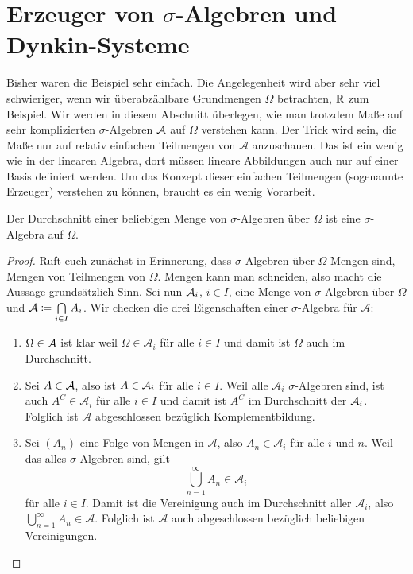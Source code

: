 \section{Erzeuger von $\sigma$-Algebren und Dynkin-Systeme}
Bisher waren die Beispiel sehr einfach. Die Angelegenheit wird aber sehr viel schwieriger, wenn wir \"uberabz\"ahlbare Grundmengen $\Omega$ betrachten, $\mathbb{R}$ zum Beispiel. Wir werden in diesem Abschnitt \"uberlegen, wie man trotzdem Ma\ss e auf sehr komplizierten $\sigma$-Algebren $\mathcal{A}$ auf $\Omega$ verstehen kann. Der Trick wird sein, die Ma\ss e nur auf relativ einfachen Teilmengen von $\mathcal A$ anzuschauen. Das ist ein wenig wie in der linearen Algebra, dort m\"ussen lineare Abbildungen auch nur auf einer Basis definiert werden. Um das Konzept dieser einfachen Teilmengen (sogenannte Erzeuger) verstehen zu k\"onnen, braucht es ein wenig Vorarbeit.
\begin{satz} 
	Der Durchschnitt einer beliebigen Menge von $\sigma$-Algebren \"uber $\Omega$ ist eine $\sigma$-Algebra auf $\Omega$.
\end{satz}
\begin{proof}
	Ruft euch zun\"achst in Erinnerung, dass $\sigma$-Algebren \"uber $\Omega$ Mengen sind, Mengen von Teilmengen von $\Omega$. Mengen kann man schneiden, also macht die Aussage grunds\"atzlich Sinn. Sei nun $\mathcal{A}_i$, $i \in I$, eine Menge von $\sigma$-Algebren \"uber $\Omega$ und $\mathcal{A} \coloneqq \bigcap\limits_{i \in I} A_i$. Wir checken die drei Eigenschaften einer $\sigma$-Algebra f\"ur $\mathcal A$:
	\begin{enumerate}[label=(\roman*)]
		\item $\Omega \in \mathcal{A}$ ist klar weil $\Omega\in \mathcal A_i$ f\"ur alle $i\in I$ und damit ist $\Omega$ auch im Durchschnitt.
		\item Sei $A \in \mathcal{A}$, also ist  $A \in \mathcal{A}_i$ f\"ur alle $i\in I$. Weil alle $\mathcal A_i$ $\sigma$-Algebren sind, ist auch $A^C\in \mathcal A_i$ f\"ur alle $i\in I$ und damit ist $A^C$ im Durchschnitt der $\mathcal{A}_i$. Folglich ist $\mathcal A$ abgeschlossen bez\"uglich Komplementbildung.
				\item Sei $(A_n)$ eine Folge von Mengen in $\mathcal A$, also $A_n \in \mathcal A_i$ f\"ur alle $i$ und $n$. Weil das alles $\sigma$-Algebren sind, gilt \[\bigcup\limits_{n = 1}^{\infty} A_n \in \mathcal A_i \]
				f\"ur alle $i\in I$. Damit ist die Vereinigung auch im Durchschnitt aller $\mathcal A_i$, also 
				$\bigcup\limits_{n = 1}^{\infty} A_n \in \mathcal A.$
				Folglich ist $\mathcal A$ auch abgeschlossen bez\"uglich beliebigen Vereinigungen.
	\end{enumerate}
\end{proof}
